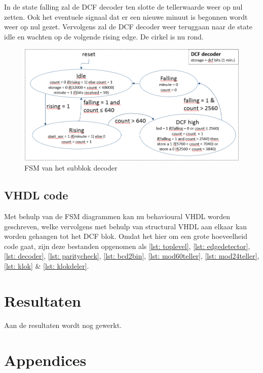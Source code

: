 \documentclass[a4paper, twoside, 10pt]{article}
\begin{document}
\noindent In de state falling zal de DCF decoder ten slotte de tellerwaarde weer op nul zetten. Ook het eventuele signaal dat er een nieuwe minuut is begonnen wordt weer op nul gezet. Vervolgens zal de DCF decoder weer teruggaan naar de state idle en wachten op de volgende rising edge. De cirkel is nu rond.

\begin{figure}[ht]
\begin{center}
\includegraphics[keepaspectratio=true,scale=0.75]{FSM_Decoder.PNG}
\caption{FSM van het subblok decoder}
\label{fig: decoder}
\end{center}
\end{figure}

\subsection{VHDL code}
Met behulp van de FSM diagrammen kan nu behavioural VHDL worden geschreven, welke vervolgens met behulp van structural VHDL aan elkaar kan worden gehangen tot het DCF blok. Omdat het hier om een grote hoeveelheid code gaat, zijn deze bestanden opgenomen als \cref{lst: toplevel}, \cref{lst: edgedetector}, \cref{lst: decoder}, \cref{lst: paritycheck}, \cref{lst: bcd2bin}, \cref{lst: mod60teller}, \cref{lst: mod24teller}, \cref{lst: klok} \& \cref{lst: klokdeler}.

\section{Resultaten}
Aan de resultaten wordt nog gewerkt.

\section{Appendices}
\end{document}
